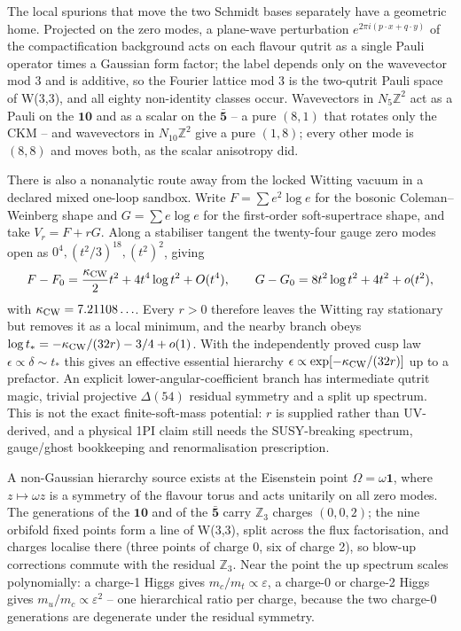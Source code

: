 The local spurions that move the two Schmidt bases separately have a geometric home. Projected on the zero modes, a plane-wave perturbation $e^{2\pi i(p\cdot x+q\cdot y)}$ of the compactification background acts on each flavour qutrit as a single Pauli operator times a Gaussian form factor; the label depends only on the wavevector mod 3 and is additive, so the Fourier lattice mod 3 is the two-qutrit Pauli space of W(3,3), and all eighty non-identity classes occur. Wavevectors in $N_5\mathbb Z^2$ act as a Pauli on the $\mathbf{10}$ and as a scalar on the $\bar{\mathbf5}$ -- a pure $(8,1)$ that rotates only the CKM -- and wavevectors in $N_{10}\mathbb Z^2$ give a pure $(1,8)$; every other mode is $(8,8)$ and moves both, as the scalar anisotropy did. 

There is also a nonanalytic route away from the locked Witting vacuum in a declared mixed one-loop sandbox.  Write $F=\sum e^2\log e$ for the bosonic Coleman--Weinberg shape and $G=\sum e\log e$ for the first-order soft-supertrace shape, and take $V_r=F+rG$.  Along a stabiliser tangent the twenty-four gauge zero modes open as $0^4,(t^2/3)^{18},(t^2)^2$, giving
\[
 F-F_0={\kappa_{\rm CW}\over2}t^2+4t^4\log t^2+O(t^4),\qquad
 G-G_0=8t^2\log t^2+4t^2+o(t^2),
\]
with $\kappa_{\rm CW}=7.21108\ldots$.  Every $r>0$ therefore leaves the Witting ray stationary but removes it as a local minimum, and the nearby branch obeys
$\log t_*=-\kappa_{\rm CW}/(32r)-3/4+o(1)$.  With the independently proved cusp law $\epsilon\propto\delta\sim t_*$ this gives an effective essential hierarchy $\epsilon\propto\exp[-\kappa_{\rm CW}/(32r)]$ up to a prefactor.  An explicit lower-angular-coefficient branch has intermediate qutrit magic, trivial projective $\Delta(54)$ residual symmetry and a split up spectrum.  This is not the exact finite-soft-mass potential: $r$ is supplied rather than UV-derived, and a physical 1PI claim still needs the SUSY-breaking spectrum, gauge/ghost bookkeeping and renormalisation prescription. 

A non-Gaussian hierarchy source exists at the Eisenstein point $\Omega=\omega\mathbf1$, where $z\mapsto\omega z$ is a symmetry of the flavour torus and acts unitarily on all zero modes. The generations of the $\mathbf{10}$ and of the $\bar{\mathbf5}$ carry $\mathbb Z_3$ charges $(0,0,2)$; the nine orbifold fixed points form a line of W(3,3), split across the flux factorisation, and charges localise there (three points of charge 0, six of charge 2), so blow-up corrections commute with the residual $\mathbb Z_3$. Near the point the up spectrum scales polynomially: a charge-1 Higgs gives $m_c/m_t\propto\varepsilon$, a charge-0 or charge-2 Higgs gives $m_u/m_c\propto\varepsilon^2$ -- one hierarchical ratio per charge, because the two charge-0 generations are degenerate under the residual symmetry. 

